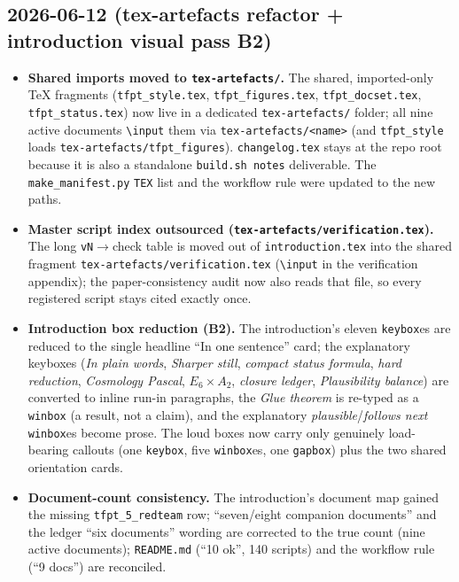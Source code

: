 \subsection*{2026-06-12 (tex-artefacts refactor + introduction visual pass B2)}
\begin{itemize}
\item \textbf{Shared imports moved to \texttt{tex-artefacts/}.} The shared, imported-only TeX
  fragments (\texttt{tfpt\_style.tex}, \texttt{tfpt\_figures.tex}, \texttt{tfpt\_docset.tex},
  \texttt{tfpt\_status.tex}) now live in a dedicated \texttt{tex-artefacts/} folder; all nine active
  documents \texttt{\textbackslash input} them via \texttt{tex-artefacts/<name>} (and
  \texttt{tfpt\_style} loads \texttt{tex-artefacts/tfpt\_figures}). \texttt{changelog.tex} stays at the
  repo root because it is also a standalone \texttt{build.sh notes} deliverable. The
  \texttt{make\_manifest.py} \texttt{TEX} list and the workflow rule were updated to the new paths.
\item \textbf{Master script index outsourced (\texttt{tex-artefacts/verification.tex}).} The long
  \texttt{vN}$\to$check table is moved out of \texttt{introduction.tex} into the shared fragment
  \texttt{tex-artefacts/verification.tex} (\texttt{\textbackslash input} in the verification appendix);
  the paper-consistency audit now also reads that file, so every registered script stays cited exactly
  once.
\item \textbf{Introduction box reduction (B2).} The introduction's eleven \texttt{keybox}es are reduced
  to the single headline ``In one sentence'' card; the explanatory keyboxes (\emph{In plain words},
  \emph{Sharper still}, \emph{compact status formula}, \emph{hard reduction}, \emph{Cosmology Pascal},
  \emph{$E_6{\times}A_2$}, \emph{closure ledger}, \emph{Plausibility balance}) are converted to inline
  run-in paragraphs, the \emph{Glue theorem} is re-typed as a \texttt{winbox} (a result, not a claim),
  and the explanatory \emph{plausible}/\emph{follows next} \texttt{winbox}es become prose. The loud
  boxes now carry only genuinely load-bearing callouts (one \texttt{keybox}, five \texttt{winbox}es,
  one \texttt{gapbox}) plus the two shared orientation cards.
\item \textbf{Document-count consistency.} The introduction's document map gained the missing
  \texttt{tfpt\_5\_redteam} row; ``seven/eight companion documents'' and the ledger ``six documents''
  wording are corrected to the true count (nine active documents); \texttt{README.md} (``10 ok'', 140
  scripts) and the workflow rule (``9 docs'') are reconciled.
\end{itemize}

